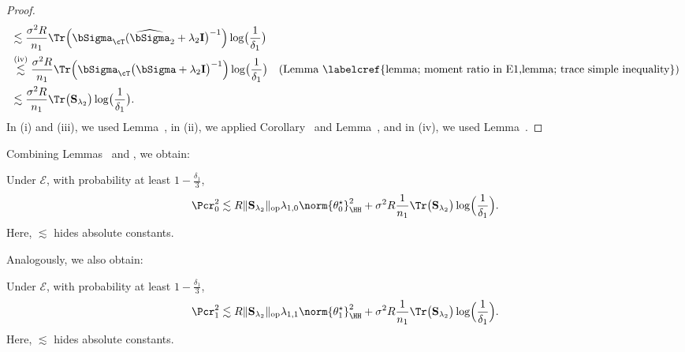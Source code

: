 \documentclass[12pt,a4paper,pdftex,onepage]{article}
\newcommand{\Sighat}{\widehat{{\bSigma}}}
\newcommand{\op}{\operatorname{op}}
\newcommand{\sig}{\sigma}
\newcommand{\Sbar}{\mathbf{S}}
\newcommand{\event}{\mathscr{E}}
\begin{document}
\begin{proof}
\begin{align*}
&\lesssim  \frac{\sig^2R}{n_1}\Tr\Bigl(\bSigma_{\cT}(\Sighat_2 + \lambda_2 \mathbf{I}\bigr)^{-1}\Bigr) \log \bigl(\frac{1}{\delta_1}\bigr)\\
&\stackrel{\text{(iv)}}{\lesssim} \frac{\sig^2R}{n_1}\Tr\Bigl(\bSigma_{\cT}\bigl(\bSigma + \lambda_2 \mathbf{I}\bigr)^{-1}\Bigr) \log \bigl(\frac{1}{\delta_1}\bigr) \quad (\text{Lemma~\labelcref{lemma; moment ratio in E1,lemma; trace simple inequality}})  \\
&\lesssim  \frac{\sig^2R}{n_1}\Tr\bigl(\Sbar_{\lambda_2}\bigr)\log \bigl(\frac{1}{\delta_1}\bigr).
\end{align*}
In (i) and (iii), we used Lemma~, 
in (ii), we applied Corollary~ and Lemma~, 
and in (iv), we used Lemma~.
\end{proof}

Combining Lemmas~ and , we obtain:

\begin{corollary}\label{corollary; RA learner bound 2}
Under \(\event\), with probability at least \(1-\frac{\delta_1}{3}\),
\[
\Pcr_0^2 \lesssim R\|\Sbar_{\lambda_2} \|_{\op}\lambda_{1,0}\norm{\theta^\star_0}_{\HH}^2 + \sig^2R \frac{1}{n_1}\Tr\bigl(\Sbar_{\lambda_2}\bigr)\log\Bigl(\frac{1}{\delta_1}\Bigr).
\]
Here, \(\lesssim\) hides absolute constants.
\end{corollary}

Analogously, we also obtain:

\begin{corollary}\label{corollary; RA learner bound 3}
Under \(\event\), with probability at least \(1-\frac{\delta_1}{3}\),
\[
\Pcr_1^2  \lesssim R\|\Sbar_{\lambda_2} \|_{\op}\lambda_{1,1}\norm{\theta^\star_1}_{\HH}^2 
+\sig^2 R \frac{1}{n_1}\Tr\bigl(\Sbar_{\lambda_2}\bigr)\log \Bigl(\frac{1}{\delta_1}\Bigr).
\]
Here, \(\lesssim\) hides absolute constants.
\end{corollary}
\end{document}
